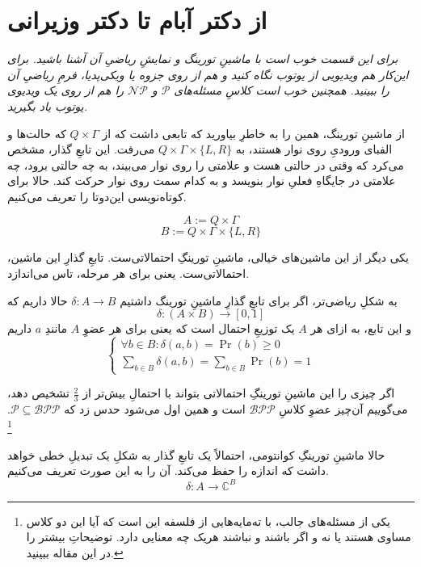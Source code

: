 \documentclass[11pt]{article}
\begin{document}
\section{از دکتر آبام تا دکتر وزیرانی}

\begin{center}
\begin{minipage}[H]{0.6\textwidth}
\emph{
برای این قسمت خوب است با ماشینِ تورینگ و نمایشِ ریاضیِ آن آشنا باشید. برای این‌کار هم ویدیویی از یوتوب نگاه کنید و هم از روی جزوه یا ویکی‌پدیا، فرمِ ریاضیِ آن را ببینید. همچنین خوب است کلاسِ مسئله‌های $\mathcal{P}$ و $\mathcal{NP}$ را هم از روی یک ویدیوی یوتوب یاد بگیرید.
}
\end{minipage}
\end{center}
\vspace{3mm}

از ماشینِ تورینگ، همین را به خاطرِ بیاورید که تابعی داشت که از $Q \times \Gamma$ که حالت‌ها و الفبای ورودیِ روی نوار هستند، به 
$Q \times \Gamma \times \{L, R\}$
می‌رفت. این تابعِ گذار، مشخص می‌کرد که وقتی در حالتی هست و علامتی را روی نوار می‌بیند، به چه حالتی برود، چه علامتی در جایگاهِ فعلیِ نوار بنویسد و به کدام سمت روی نوار حرکت کند. حالا برای کوتاه‌نویسی این‌دوتا را تعریف می‌کنیم.

\[A := Q \times \Gamma\]
\[B := Q \times \Gamma \times \{L, R\}\]

یکی دیگر از این ماشین‌های خیالی، ماشینِ تورینگِ احتمالاتی‌ست. تابعِ گذارِ این ماشین، احتمالاتی‌ست. یعنی برای هر مرحله، تاس می‌اندازد.

به شکلِ ریاضی‌تر، اگر برای تابعِ گذارِ ماشینِ تورینگ داشتیم 
$\delta: A \rightarrow B$
حالا داریم که
\[ \delta: (A \times B) \rightarrow [0,1] \]
و این تابع، به ازای هر $A$ یک توزیعِ احتمال است که یعنی برای هر عضوِ $A$ مانندِ $a$ داریم
\[ \begin{cases}
  \forall b \in B: \delta(a, b) = \Pr(b) \ge 0 \\
  \sum_{b \in B} \delta(a, b) = \sum_{b \in B} \Pr(b) = 1
\end{cases} \]

اگر چیزی را این ماشینِ تورینگِ احتمالاتی بتواند با احتمالِ بیش‌تر از $\frac{2}{3}$ تشخیص دهد، می‌گوییم آن‌چیز عضوِ کلاسِ
$\mathcal{BPP}$ است و همین اول می‌شود حدس زد که $\mathcal{P} \subseteq \mathcal{BPP}$.
\footnote{یکی از مسئله‌های جالب، با ته‌مایه‌هایی از فلسفه این است که آیا این دو کلاس مساوی هستند یا نه و اگر باشند و نباشند هریک چه معنایی دارد. توضیحاتِ بیشتر را در این مقاله \cite{goldreich} ببینید.}

حالا ماشینِ تورینگِ کوانتومی، احتمالاً یک تابعِ گذار به شکلِ یک تبدیلِ خطی خواهد داشت که اندازه را حفظ می‌کند. آن را به این صورت تعریف می‌کنیم.
\cite{deutsch}
\[ \delta: A \rightarrow \mathbb{C}^{B} \]
\end{document}

